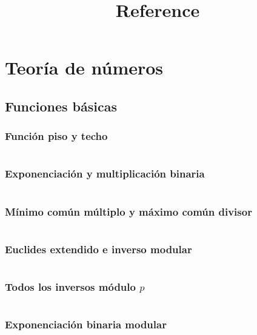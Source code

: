 \documentclass[11pt]{article}
\title{Reference}
\begin{document}
	\tableofcontents
	
	\clearpage
	\section{Teoría de números}
		\subsection{Funciones básicas}
			\subsubsection{Función piso y techo}
			\inputminted[tabsize=2,breaklines,firstline=5,lastline=21,fontsize=\small]{c++}{numberTheory.cpp}
			
			\subsubsection{Exponenciación y multiplicación binaria}
			\inputminted[tabsize=2,breaklines,firstline=23,lastline=46,fontsize=\small]{c++}{numberTheory.cpp}
			
			\subsubsection{Mínimo común múltiplo y máximo común divisor}
			\inputminted[tabsize=2,breaklines,firstline=48,lastline=68,fontsize=\small]{c++}{numberTheory.cpp}
			
			\subsubsection{Euclides extendido e inverso modular}
			\inputminted[tabsize=2,breaklines,firstline=70,lastline=91,fontsize=\small]{c++}{numberTheory.cpp}
			
			\subsubsection{Todos los inversos módulo $p$}
			\inputminted[tabsize=2,breaklines,firstline=711,lastline=718,fontsize=\small]{c++}{numberTheory.cpp}
			
			\subsubsection{Exponenciación binaria modular}
			\inputminted[tabsize=2,breaklines,firstline=93,lastline=106,fontsize=\small]{c++}{numberTheory.cpp}
			
\end{document}
